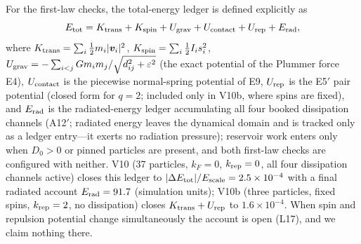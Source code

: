 \documentclass[aps,reprint,amsmath,amssymb,nofootinbib,superscriptaddress,floatfix]{revtex4-2}
\newcommand{\vect}[1]{\bm{#1}}
\newcommand{\Dz}{D_0}
\begin{document}
For the first-law checks, the total-energy ledger is defined
explicitly as
\begin{equation}
E_{\rm tot} = K_{\rm trans} + K_{\rm spin} + U_{\rm grav}
 + U_{\rm contact} + U_{\rm rep} + E_{\rm rad},
\label{eq:etot}
\end{equation}
where $K_{\rm trans} = \sum_i \tfrac12 m_i|\vect{v}_i|^2$,
$K_{\rm spin} = \sum_i \tfrac12 I_i s_i^2$,
$U_{\rm grav} = -\sum_{i<j} G m_i m_j/\sqrt{d_{ij}^2+\varepsilon^2}$
(the exact potential of the Plummer force E4),
$U_{\rm contact}$ is the piecewise normal-spring potential of E9,
$U_{\rm rep}$ is the E5$'$ pair potential (closed form for $q=2$;
included only in V10b, where spins are fixed), and $E_{\rm rad}$ is
the radiated-energy ledger accumulating all four booked dissipation
channels (A12$'$; radiated energy leaves the dynamical domain and is
tracked only as a ledger entry---it exerts no radiation pressure);
reservoir work enters only when $\Dz>0$ or pinned
particles are present, and both first-law checks are configured with
neither.
V10 (37 particles, $k_F = 0$, $k_{\rm rep}=0$, all four dissipation
channels active) closes this ledger to $|\Delta E_{\rm tot}|/E_{\rm scale} =
2.5\times10^{-4}$ with a final radiated account
$E_{\rm rad} = 91.7$ (simulation units); V10b (three particles, fixed
spins, $k_{\rm rep}=2$, no dissipation) closes
$K_{\rm trans}+U_{\rm rep}$ to $1.6\times10^{-4}$.
When spin and repulsion potential change simultaneously the account is
open (L17), and we claim nothing there.
\end{document}

